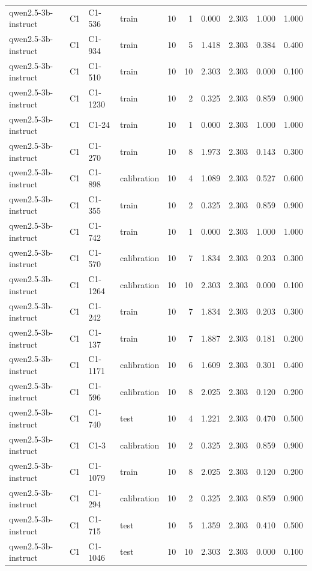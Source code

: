 \begin{table}
\begin{tabular}{llllrrrrrr}
qwen2.5-3b-instruct & C1 & C1-536 & train & 10 & 1 & 0.000 & 2.303 & 1.000 & 1.000 \\
qwen2.5-3b-instruct & C1 & C1-934 & train & 10 & 5 & 1.418 & 2.303 & 0.384 & 0.400 \\
qwen2.5-3b-instruct & C1 & C1-510 & train & 10 & 10 & 2.303 & 2.303 & 0.000 & 0.100 \\
qwen2.5-3b-instruct & C1 & C1-1230 & train & 10 & 2 & 0.325 & 2.303 & 0.859 & 0.900 \\
qwen2.5-3b-instruct & C1 & C1-24 & train & 10 & 1 & 0.000 & 2.303 & 1.000 & 1.000 \\
qwen2.5-3b-instruct & C1 & C1-270 & train & 10 & 8 & 1.973 & 2.303 & 0.143 & 0.300 \\
qwen2.5-3b-instruct & C1 & C1-898 & calibration & 10 & 4 & 1.089 & 2.303 & 0.527 & 0.600 \\
qwen2.5-3b-instruct & C1 & C1-355 & train & 10 & 2 & 0.325 & 2.303 & 0.859 & 0.900 \\
qwen2.5-3b-instruct & C1 & C1-742 & train & 10 & 1 & 0.000 & 2.303 & 1.000 & 1.000 \\
qwen2.5-3b-instruct & C1 & C1-570 & calibration & 10 & 7 & 1.834 & 2.303 & 0.203 & 0.300 \\
qwen2.5-3b-instruct & C1 & C1-1264 & calibration & 10 & 10 & 2.303 & 2.303 & 0.000 & 0.100 \\
qwen2.5-3b-instruct & C1 & C1-242 & train & 10 & 7 & 1.834 & 2.303 & 0.203 & 0.300 \\
qwen2.5-3b-instruct & C1 & C1-137 & train & 10 & 7 & 1.887 & 2.303 & 0.181 & 0.200 \\
qwen2.5-3b-instruct & C1 & C1-1171 & calibration & 10 & 6 & 1.609 & 2.303 & 0.301 & 0.400 \\
qwen2.5-3b-instruct & C1 & C1-596 & calibration & 10 & 8 & 2.025 & 2.303 & 0.120 & 0.200 \\
qwen2.5-3b-instruct & C1 & C1-740 & test & 10 & 4 & 1.221 & 2.303 & 0.470 & 0.500 \\
qwen2.5-3b-instruct & C1 & C1-3 & calibration & 10 & 2 & 0.325 & 2.303 & 0.859 & 0.900 \\
qwen2.5-3b-instruct & C1 & C1-1079 & train & 10 & 8 & 2.025 & 2.303 & 0.120 & 0.200 \\
qwen2.5-3b-instruct & C1 & C1-294 & calibration & 10 & 2 & 0.325 & 2.303 & 0.859 & 0.900 \\
qwen2.5-3b-instruct & C1 & C1-715 & test & 10 & 5 & 1.359 & 2.303 & 0.410 & 0.500 \\
qwen2.5-3b-instruct & C1 & C1-1046 & test & 10 & 10 & 2.303 & 2.303 & 0.000 & 0.100 \\

\end{tabular}
\end{table}
